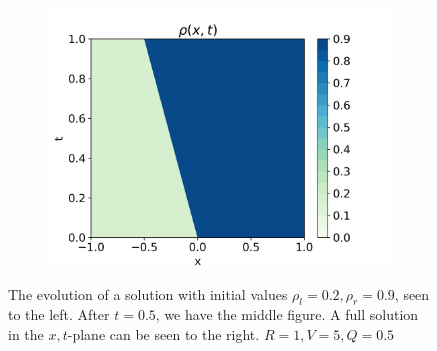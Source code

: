 \documentclass[10pt]{article}
\numberwithin{equation}{section}
\begin{document}
\begin{figure}
     \hfill
     \begin{subfigure}[b]{0.3\textwidth}
         \centering
         \includegraphics[width=\textwidth]{Figures/Model/Plots/BackwShockFull.png}
     \end{subfigure}
        \caption{The evolution of a solution with initial values $\rho_l = 0.2, \rho_r = 0.9$, seen to the left. After $t = 0.5$, we have the middle figure. A full solution in the $x,t$-plane can be seen to the right. $R = 1, V = 5, Q = 0.5$}
        \label{fig:ExampleBackwardsShock}
\end{figure}
\end{document}
